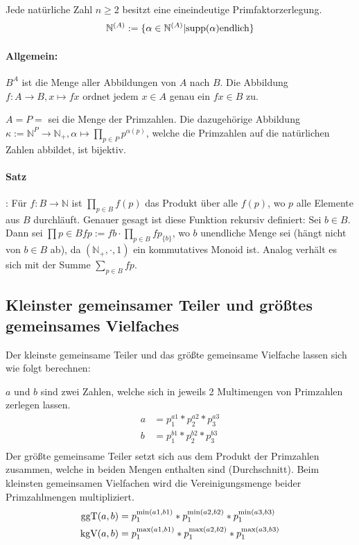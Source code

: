 Jede natürliche Zahl $n \ge 2$ besitzt eine eineindeutige
Primfaktorzerlegung.
\begin{align*}
\mathbb N^{(A)} := \{ \alpha \in \mathbb N^{(A)} | \text{supp}(\alpha) \text{endlich}
\}
\end{align*}

\paragraph{Allgemein:} $B^A$ ist die Menge aller Abbildungen von $A$ nach $B$.
Die Abbildung $f: A \rightarrow B, x \mapsto f x$ ordnet jedem $x \in A$ genau
ein $f x \in B$ zu.

$A = P = $ sei die Menge der Primzahlen.  
Die dazugehörige Abbildung $\kappa:= \mathbb N^P \rightarrow \mathbb N_+,
\alpha \mapsto \prod \limits_{p \in P} p^{\alpha(p)}$, welche die Primzahlen
auf die natürlichen Zahlen abbildet, ist bijektiv.

\paragraph{Satz}: Für $f: B \rightarrow \mathbb N$ ist $\prod \limits_{p \in B}
f(p)$ das Produkt über alle $f(p)$, wo $p$ alle Elemente aus $B$ durchläuft.
Genauer gesagt ist diese Funktion \glqq rekursiv definiert\grqq: Sei $b \in B$.
Dann sei $\prod \limits{p \in B} f p := f b \cdot \prod \limits_{p \in B}
f p_{ \{b \}}$, wo $b$ unendliche Menge sei (hängt nicht von $b \in B$ ab), da
$(\mathbb N_+, \cdot, 1)$ ein kommutatives Monoid ist. Analog verhält es sich
mit der Summe $\sum \limits_{p \in B} fp$.

\subsection{Kleinster gemeinsamer Teiler und größtes gemeinsames Vielfaches}

Der kleinste gemeinsame Teiler und das größte gemeinsame Vielfache
lassen sich wie folgt berechnen:

$a$ und $b$ sind zwei Zahlen, welche sich in jeweils 2 Multimengen von
Primzahlen zerlegen lassen.
\begin{align*}
  a &= p_1^{a1} * p_2^{a2} * p_3^{a3}\\
  b &= p_1^{b1} * p_2^{b2} * p_3^{b3}\\
\end{align*}
Der größte gemeinsame Teiler setzt sich aus dem Produkt der
Primzahlen zusammen, welche in beiden Mengen enthalten sind
(Durchschnitt). Beim kleinsten gemeinsamen Vielfachen wird die
Vereinigungsmenge beider Primzahlmengen multipliziert.
\begin{align*}
  \text{ggT}(a,b) &= p_1^{\min(a1,b1)} * p_1^{\min(a2,b2)} * p_1^{\min(a3,b3)}\\
  \text{kgV}(a,b) &= p_1^{\max(a1,b1)} * p_1^{\max(a2,b2)} * p_1^{\max(a3,b3)}\\
\end{align*}

